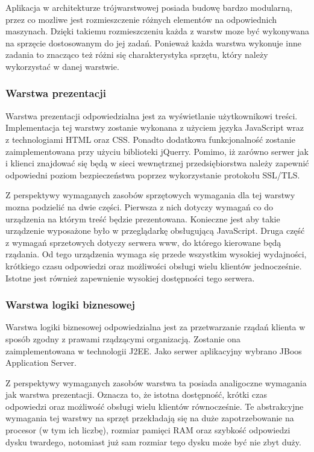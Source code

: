 Aplikacja w architekturze trójwarstwowej posiada budowę bardzo
modularną, przez co mozliwe jest rozmieszczenie różnych elementów na
odpowiednich maszynach. Dzięki takiemu rozmieszczeniu każda z warstw
moze być wykonywana na sprzęcie dostosowanym do jej zadań. Ponieważ
każda warstwa wykonuje inne zadania to znacząco też różni się
charakterystyka sprzętu, który należy wykorzystać w danej warstwie.

\subsubsection{Warstwa prezentacji}

Warstwa prezentacji odpowiedzialna jest za wyświetlanie użytkownikowi
treści. Implementacja tej warstwy zostanie wykonana z użyciem języka
JavaScript wraz z technologiami HTML oraz CSS. Ponadto dodatkowa
funkcjonalność zostanie zaimplementowana przy użyciu biblioteki
jQuerry. Pomimo, iż zarówno serwer jak i klienci znajdować się będą w
sieci wewnętrznej przedsiębiorstwa należy zapewnić odpowiedni poziom
bezpieczeństwa poprzez wykorzystanie protokołu SSL/TLS.

Z perspektywy wymaganych zasobów sprzętowych wymagania dla tej warstwy
mozna podzielić na dwie części. Pierwsza z nich dotyczy wymagań co do
urządzenia na którym treść będzie prezentowana. Konieczne jest aby
takie urządzenie wyposażone było w przeglądarkę obsługującą
JavaScript. Druga część z wymagań sprzetowych dotyczy serwera www, do
którego kierowane będą rządania. Od tego urządzenia wymaga się przede
wszystkim wysokiej wydajności, krótkiego czasu odpowiedzi oraz
możliwości obsługi wielu klientów jednocześnie. Istotne jest również
zapewnienie wysokiej dostępności tego serwera.

\subsubsection{Warstwa logiki biznesowej}

Warstwa logiki biznesowej odpowiedzialna jest za przetwarzanie rządań
klienta w sposób zgodny z prawami rządzącymi organizacją. Zostanie ona
zaimplementowana w technologii J2EE. Jako serwer aplikacyjny wybrano
JBoos Application Server.

Z perspektywy wymaganych zasobów warstwa ta posiada analigoczne
wymagania jak warstwa prezentacji. Oznacza to, że istotna dostępność,
krótki czas odpowiedzi oraz możliwość obsługi wielu klientów
równocześnie. Te abstrakcyjne wymagania tej warstwy na sprzęt
przekładają się na duże zapotrzebowanie na procesor (w tym ich
liczbę), rozmiar pamięci RAM oraz szybkość odpowiedzi dysku twardego,
notomiast już sam rozmiar tego dysku może być nie zbyt duży.

